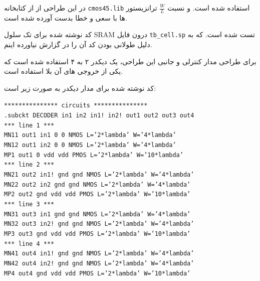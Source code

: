 \documentclass[12pt]{exam}
\begin{document}
\begin{questions}
\begin{enumerate}
در این طراحی از از کتابخانه \texttt{cmos45.lib} استفاده شده است. و نسبت $\frac{W}{L}$ ترانزیستور ها با سعی و خطا بدست آورده شده است.

کد نوشته شده برای تک سلول SRAM درون فایل \texttt{tb\_cell.sp} تست شده است. که به دلیل طولانی بودن کد آن را در گزارش نیاورده اینم.

برای طراحی مدار کنترلی و جانبی این طراحی، یک دیکدر ۲ به ۴ استفاده شده است که یکی از خروجی های آن بلا استفاده است.

کد نوشته شده برای مدار دیکدر به صورت زیر است:
\begin{latin}
	 \texttt{*************** circuits ***************}\\
	 
	 \texttt{.subckt DECODER in1 in2 in1! in2! out1 out2 out3 out4}\\
	 
	 \texttt{*** line 1 ***}\\
	 \texttt{MN11 out1 in1 0   0   NMOS  L='2*lambda' W='4*lambda'}\\
	 \texttt{MN12 out1 in2 0   0   NMOS  L='2*lambda' W='4*lambda'}\\
	 \texttt{MP1  out1 0   vdd vdd PMOS  L='2*lambda' W='10*lambda'}\\
	 
	 \texttt{*** line 2 ***}\\
	 \texttt{MN21 out2 in1! gnd gnd NMOS  L='2*lambda' W='4*lambda'}\\
	 \texttt{MN22 out2 in2  gnd gnd NMOS  L='2*lambda' W='4*lambda'}\\
	 \texttt{MP2  out2 gnd  vdd vdd PMOS  L='2*lambda' W='10*lambda'}\\
	 
	 \texttt{*** line 3 ***}\\
	 \texttt{MN31  out3 in1  gnd gnd NMOS  L='2*lambda' W='4*lambda'}\\
	 \texttt{MN32  out3 in2! gnd gnd NMOS  L='2*lambda' W='4*lambda'}\\
	 \texttt{MP3   out3 gnd  vdd vdd PMOS  L='2*lambda' W='10*lambda'}\\
	 
	 \texttt{*** line 4 ***}\\
	 \texttt{MN41  out4 in1! gnd gnd NMOS  L='2*lambda' W='4*lambda'}\\
	 \texttt{MN42  out4 in2! gnd gnd NMOS  L='2*lambda' W='4*lambda'}\\
	 \texttt{MP4   out4 gnd  vdd vdd PMOS  L='2*lambda' W='10*lambda'}\\
	 

\end{latin}
\end{enumerate}
\end{questions}
\end{document}
